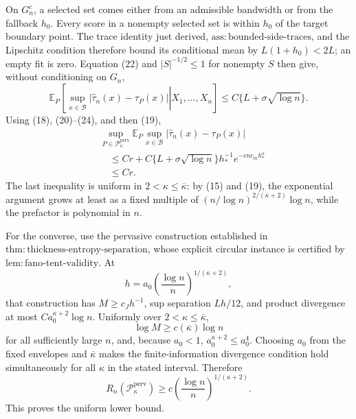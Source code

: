 On \(G_n^c\), a selected set comes either from an admissible bandwidth or from the fallback \(h_0\).  Every score in a nonempty selected set is within \(h_0\) of the target boundary point.  The trace identity just derived, \(\mathrm{ass:bounded\text{-}side\text{-}traces}\), and the Lipschitz condition therefore bound its conditional mean by \(L(1+h_0)<2L\); an empty fit is zero.  Equation (22) and \(|S|^{-1/2}\le1\) for nonempty \(S\) then give, without conditioning on \(G_n\),
\[
 \mathbb E_P\left[
 \left.\sup_{x\in\mathcal B}|\widehat\tau_n(x)-\tau_P(x)|
 \right|X_1,\ldots,X_n\right]
 \le C\{L+\sigma\sqrt{\log n}\}. \tag{24}
\]
Using (18), (20)--(24), and then (19),
\[
 \begin{aligned}
 &\sup_{P\in\mathcal P_\kappa^{\mathrm{perv}}}
 \mathbb E_P\sup_{x\in\mathcal B}|\widehat\tau_n(x)-\tau_P(x)|\\
 &\quad\le Cr+C\{L+\sigma\sqrt{\log n}\}
 h_*^{-1}e^{-c n c_mh_*^\kappa}\\
 &\quad\le Cr. \tag{25}
 \end{aligned}
\]
The last inequality is uniform in \(2<\kappa\le\overline\kappa\): by (15) and (19), the exponential argument grows at least as a fixed multiple of \((n/\log n)^{2/(\overline\kappa+2)}\log n\), while the prefactor is polynomial in \(n\).

For the converse, use the pervasive construction established in \(\mathrm{thm:thickness\text{-}entropy\text{-}separation}\), whose explicit circular instance is certified by \(\mathrm{lem:fano\text{-}tent\text{-}validity}\).  At
\[
 h=a_0\left(\frac{\log n}{n}\right)^{1/(\kappa+2)},
\]
that construction has \(M\ge c_Jh^{-1}\), sup separation \(Lh/12\), and product divergence at most \(Ca_0^{\kappa+2}\log n\).  Uniformly over \(2<\kappa\le\overline\kappa\),
\[
 \log M\ge c(\overline\kappa)\log n
\]
for all sufficiently large \(n\), and, because \(a_0<1\), \(a_0^{\kappa+2}\le a_0^4\).  Choosing \(a_0\) from the fixed envelopes and \(\overline\kappa\) makes the finite-information divergence condition hold simultaneously for all \(\kappa\) in the stated interval.  Therefore
\[
 R_n(\mathcal P_\kappa^{\mathrm{perv}})
 \ge c\left(\frac{\log n}{n}\right)^{1/(\kappa+2)}. \tag{26}
\]
This proves the uniform lower bound.

